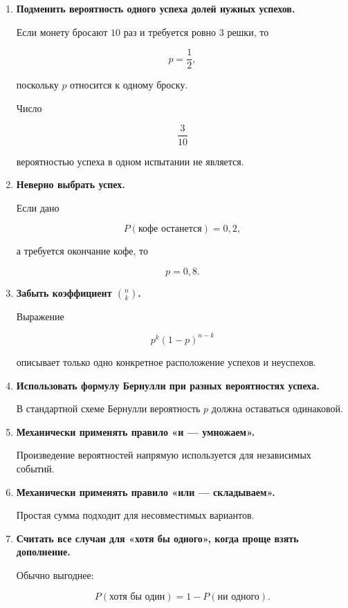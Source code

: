 \documentclass[a4paper,12pt]{article}
\newcommand{\key}[1]{\textbf{\color{darkaccent}#1}}
\begin{document}
\begin{enumerate}
    \item \key{Подменить вероятность одного успеха долей нужных успехов.}

    Если монету бросают $10$ раз и требуется ровно $3$ решки, то

    \[
    p=\frac12,
    \]

    поскольку $p$ относится к одному броску.

    Число

    \[
    \frac3{10}
    \]

    вероятностью успеха в одном испытании не является.

    \item \key{Неверно выбрать успех.}

    Если дано

    \[
    P(\text{кофе останется})=0{,}2,
    \]

    а требуется окончание кофе, то

    \[
    p=0{,}8.
    \]

    \item \key{Забыть коэффициент $\binom nk$.}

    Выражение

    \[
    p^k(1-p)^{n-k}
    \]

    описывает только одно конкретное расположение успехов и неуспехов.

    \item \key{Использовать формулу Бернулли при разных вероятностях успеха.}

    В стандартной схеме Бернулли вероятность $p$ должна оставаться одинаковой.

    \item \key{Механически применять правило «и --- умножаем».}

    Произведение вероятностей напрямую используется для независимых событий.

    \item \key{Механически применять правило «или --- складываем».}

    Простая сумма подходит для несовместимых вариантов.

    \item \key{Считать все случаи для «хотя бы одного», когда проще взять дополнение.}

    Обычно выгоднее:

    \[
    P(\text{хотя бы один})
    =
    1-P(\text{ни одного}).
    \]
\end{enumerate}
\end{document}
